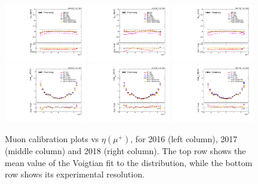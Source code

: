 \begin{figure}[!htb]
      \centering
      \includegraphics[width=0.32\textwidth]{pics/muon_corr/muon_cal/2016/muP_eta_summary_mean.pdf}
      \includegraphics[width=0.32\textwidth]{pics/muon_corr/muon_cal/2017/muP_eta_summary_mean.pdf}
      \includegraphics[width=0.32\textwidth]{pics/muon_corr/muon_cal/2018/muP_eta_summary_mean.pdf}
      \includegraphics[width=0.32\textwidth]{pics/muon_corr/muon_cal/2016/muP_eta_summary_reso.pdf}
      \includegraphics[width=0.32\textwidth]{pics/muon_corr/muon_cal/2017/muP_eta_summary_reso.pdf}
      \includegraphics[width=0.32\textwidth]{pics/muon_corr/muon_cal/2018/muP_eta_summary_reso.pdf}
      \caption{Muon calibration plots vs $\eta(\mu^{+})$, for 2016 (left column), 2017 (middle column) and 2018 (right column).
               The top row shows the mean value of the Voigtian fit to the \mmm distribution, 
               while the bottom row shows its experimental resolution.}
      \label{fig:mucal_muP_eta}
\end{figure}


